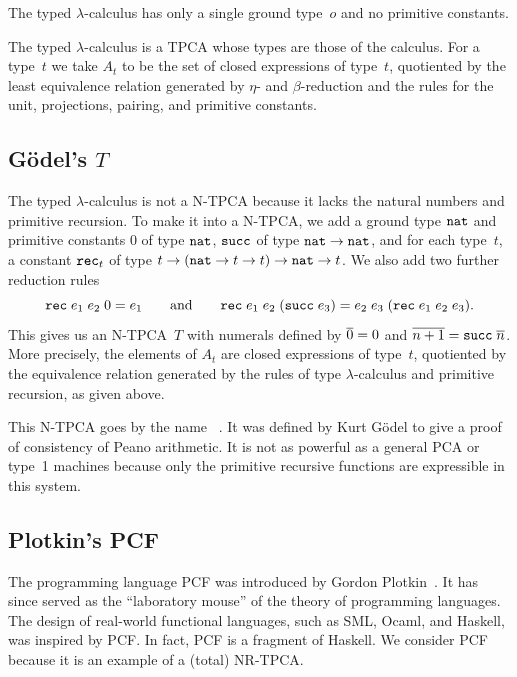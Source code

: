 The  typed $\lambda$-calculus has only a single ground
type~$o$ and no primitive constants.

The typed $\lambda$-calculus is a TPCA whose types are those of the
calculus. For a type~$t$ we take $A_t$ to be the set of closed
expressions of type~$t$, quotiented by the least equivalence relation
generated by $\eta$- and $\beta$-reduction and the rules for the unit,
projections, pairing, and primitive constants.

\subsection[\texorpdfstring{Gödel's $T$}{Gödel's T}]{Gödel's $T$}

The typed $\lambda$-calculus is not a N-TPCA because it lacks the
natural numbers and primitive recursion. To make it into a N-TPCA, we
add a ground type $\mathtt{nat}$ and primitive constants $0$ of type
$\mathtt{nat}$, $\mathtt{succ}$ of type $\mathtt{nat} \to \mathtt{nat}$, and for each
type~$t$, a constant $\mathtt{rec}_t$ of type $t \to (\mathtt{nat} \to t
\to t) \to \mathtt{nat} \to t$. We also add two further reduction rules
%
\begin{equation*}
  \mathtt{rec} \; e_1 \; e_2 \; 0 = e_1
  \qquad\text{and}\qquad
  \mathtt{rec} \; e_1 \; e_2 \; (\mathtt{succ} \; e_3) =
  e_2 \; e_3 \; (\mathtt{rec} \; e_1 \; e_2 \; e_3).
\end{equation*}
%
This gives us an N-TPCA~$T$ with numerals defined by $\overline{0} = 0$
and $\overline{n+1} = \mathtt{succ} \; \overline{n}$. More precisely, the
elements of $A_t$ are closed expressions of type~$t$, quotiented by
the equivalence relation generated by the rules of type
$\lambda$-calculus and primitive recursion, as given above.

This N-TPCA goes by the name ~. It was defined by Kurt Gödel to give a
proof of consistency of Peano arithmetic. It is not as powerful as a
general PCA or type~1 machines because only the primitive recursive
functions are expressible in this system.

\subsection{Plotkin's PCF}
\label{sec:pcf}

The programming language PCF was introduced by Gordon
Plotkin~. It has since
served as the ``laboratory mouse'' of the theory of programming
languages. The design of real-world functional languages, such as SML,
Ocaml, and Haskell, was inspired by PCF. In fact, PCF is a fragment of
Haskell. We consider PCF because it is an example of a (total)
NR-TPCA.

